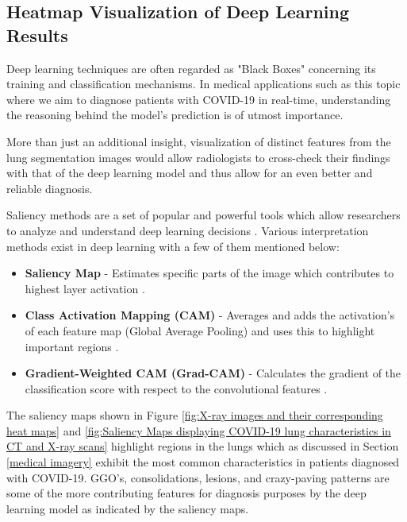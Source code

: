 \subsection{Heatmap Visualization of Deep Learning Results}
\label{Interpreting Deep Learning Results}
Deep learning techniques are often regarded as "Black Boxes" concerning 
its training and classification mechanisms. In medical applications such as this topic where we 
aim to diagnose patients with COVID-19 in real-time, understanding the reasoning behind the model's prediction 
is of utmost importance. 

More than just an additional insight, visualization of distinct features 
from the lung segmentation images would allow radiologists to cross-check their findings with that of the deep 
learning model and thus allow for an even better and reliable diagnosis.

Saliency methods are a set of popular and powerful tools which allow researchers 
to analyze and understand deep learning decisions \cite{AGM+2018}. 
Various interpretation methods exist in deep learning with a few of them 
mentioned below:
\begin{itemize}
    \item \textbf{Saliency Map} - Estimates specific parts of the image which contributes to highest layer activation \cite{ZMF2013}.
    \item \textbf{Class Activation Mapping (CAM)} - Averages and adds the activation's of each feature map (Global Average Pooling) and uses this to highlight important regions \cite{ZKL+2015}.
    \item \textbf{Gradient-Weighted CAM (Grad-CAM)} - Calculates the gradient of the classification score with respect to the convolutional features \cite{RCD+2017}.
\end{itemize}

The saliency maps shown in Figure \ref{fig:X-ray images and their corresponding heat maps} and \ref{fig:Saliency Maps displaying COVID-19 lung characteristics in CT and X-ray scans} highlight regions in the lungs 
which as discussed in Section \ref{medical imagery} exhibit the most common characteristics 
in patients diagnosed with COVID-19. 
GGO's, consolidations, lesions, and crazy-paving patterns are some of the 
more contributing features for diagnosis purposes by the 
deep learning model as indicated by the saliency maps.

